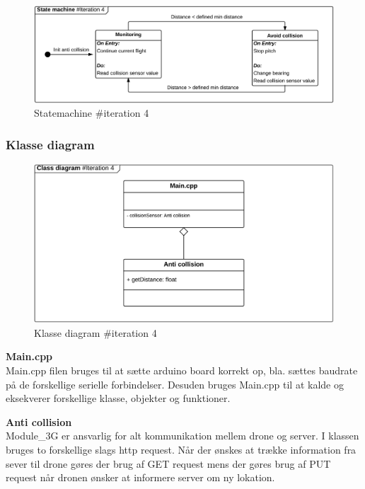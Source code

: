 \begin{figure}[H]
	\centering
	\includegraphics[width=1\textwidth]{Billeder/statemachine/State_iteration4.png}
	\vspace{-0.5cm}
	\caption{Statemachine \#iteration 4}
	\label{fig:Statemachine_iteration4}
\end{figure}



\subsubsection*{Klasse diagram}
\vspace{-0.1cm}

\begin{figure}[H]
	\centering
	\includegraphics[width=1\textwidth]{Billeder/klasse_diagrammer/classdiagram_iteration4.png}
	\vspace{-0.5cm}
	\caption{Klasse diagram \#iteration 4}
	\label{fig:classDiagram_iteration4}
\end{figure}


\textbf{Main.cpp} \\
Main.cpp filen bruges til at sætte arduino board korrekt op, bla. sættes baudrate på de forskellige serielle forbindelser. Desuden bruges Main.cpp til at kalde og eksekverer forskellige klasse, objekter og funktioner.


\textbf{Anti collision} \\
Module\_3G er ansvarlig for alt kommunikation mellem drone og server. I klassen bruges to forskellige slags http request. Når der ønskes at trække information fra sever til drone gøres der brug af GET request mens der gøres brug af PUT request når dronen ønsker at informere server om ny lokation.
